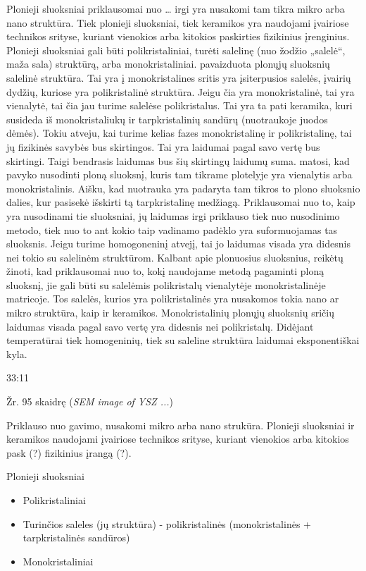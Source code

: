 Plonieji sluoksniai priklausomai nuo … irgi yra nusakomi tam tikra
mikro arba nano struktūra. Tiek plonieji sluoksniai, tiek keramikos
yra naudojami įvairiose technikos srityse, kuriant vienokios arba
kitokios paskirties fizikinius įrenginius.
Plonieji sluoksniai gali būti polikristaliniai, turėti salelinę
(nuo žodžio „salelė“, maža sala) struktūrą, arba monokristaliniai.
 pavaizduota plonųjų sluoksnių salelinė struktūra. Tai
yra į monokristalines sritis yra įsiterpusios salelės, įvairių dydžių,
kuriose yra polikristalinė struktūra. Jeigu čia yra monokristalinė,
tai yra vienalytė, tai čia jau turime salelėse polikristalus. Tai
yra ta pati keramika, kuri susideda iš monokristaliukų ir
tarpkristalinių sandūrų (nuotraukoje juodos dėmės). Tokiu atveju,
kai turime kelias fazes monokristalinę ir polikristalinę, tai jų
fizikinės savybės bus skirtingos. Tai yra laidumai pagal savo vertę
bus skirtingi. Taigi bendrasis laidumas bus šių skirtingų laidumų
suma.  matosi, kad pavyko nusodinti ploną sluoksnį, kuris
tam tikrame plotelyje yra vienalytis arba monokristalinis. Aišku,
kad nuotrauka yra padaryta tam tikros to plono sluoksnio dalies,
kur pasisekė išskirti tą tarpkristalinę medžiagą.
Priklausomai nuo to, kaip yra nusodinami tie sluoksniai, jų laidumas
irgi priklauso tiek nuo nusodinimo metodo, tiek nuo to ant kokio taip
vadinamo padėklo yra suformuojamas tas sluoksnis. Jeigu turime
homogoneninį atvejį, tai jo laidumas visada yra didesnis nei tokio su
salelinėm struktūrom. Kalbant apie plonuosius sluoksnius, reikėtų
žinoti, kad priklausomai nuo to, kokį naudojame metodą pagaminti
ploną sluoksnį, jie gali būti su salelėmis polikristalų vienalytėje
monokristalinėje matricoje. Tos salelės, kurios yra polikristalinės
yra nusakomos tokia nano ar mikro struktūra, kaip ir keramikos.
Monokristalinių plonųjų sluoksnių sričių laidumas visada pagal savo
vertę yra didesnis nei polikristalų. Didėjant temperatūrai tiek
homogeninių, tiek su saleline struktūra laidumai eksponentiškai
kyla.


33:11

Žr. 95 skaidrę (\textit{SEM image of YSZ ...})

Priklauso nuo gavimo, nusakomi mikro arba nano strukūra.
Plonieji sluoksniai ir keramikos naudojami įvairiose technikos srityse,
kuriant vienokios arba kitokios pask (?) fizikinius įrangą (?).

Plonieji sluoksniai\begin{itemize}
  \item Polikristaliniai
  \item Turinčios saleles (jų struktūra) - polikristalinės
  (monokristalinės + tarpkristalinės sandūros)
  \item Monokristaliniai
\end{itemize}

